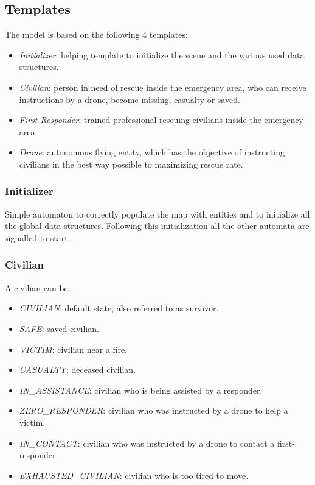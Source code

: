 \subsection{Templates}
The model is based on the following 4 templates:
\begin{itemize}
	\item \textit{Initializer}: helping template to initialize the scene and the various used data structures.
	\item \textit{Civilian}: person in need of rescue inside the emergency area, who can receive instructions by a drone, become missing, casualty or saved.
	\item \textit{First-Responder}: trained professional rescuing civilians inside the emergency area.
	\item \textit{Drone}: autonomous flying entity, which has the objective of instructing civilians in the best way possible to maximizing rescue rate.
\end{itemize}


\subsubsection{Initializer}
Simple automaton to correctly populate the map with entities and to initialize all the global data structures. Following this initialization all the other automata are signalled to start.


\subsubsection{Civilian}
A civilian can be:
\begin{itemize}
	\item \textit{CIVILIAN}: default state, also referred to as survivor.
	\item \textit{SAFE}: saved civilian.
	\item \textit{VICTIM}: civilian near a fire.
	\item \textit{CASUALTY}: deceased civilian.
	\item \textit{IN\_ASSISTANCE}: civilian who is being assisted by a responder.
	\item \textit{ZERO\_RESPONDER}: civilian who was instructed by a drone to help a victim.
	\item \textit{IN\_CONTACT}: civilian who was instructed by a drone to contact a first-responder.
	\item \textit{EXHAUSTED\_CIVILIAN}: civilian who is too tired to move.
\end{itemize}

